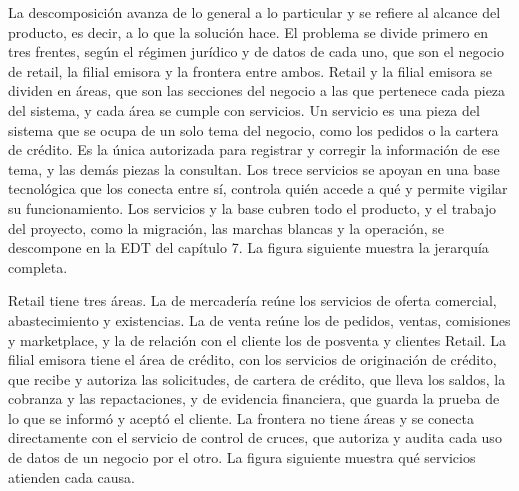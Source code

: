 \documentclass[11pt]{article}
\begin{document}
La descomposición avanza de lo general a lo particular y se refiere al alcance del producto, es decir, a lo que la solución hace. El problema se divide primero en tres frentes, según el régimen jurídico y de datos de cada uno, que son el negocio de retail, la filial emisora y la frontera entre ambos. Retail y la filial emisora se dividen en áreas, que son las secciones del negocio a las que pertenece cada pieza del sistema, y cada área se cumple con servicios. Un servicio es una pieza del sistema que se ocupa de un solo tema del negocio, como los pedidos o la cartera de crédito. Es la única autorizada para registrar y corregir la información de ese tema, y las demás piezas la consultan. Los trece servicios se apoyan en una base tecnológica que los conecta entre sí, controla quién accede a qué y permite vigilar su funcionamiento. Los servicios y la base cubren todo el producto, y el trabajo del proyecto, como la migración, las marchas blancas y la operación, se descompone en la EDT del capítulo 7. La figura siguiente muestra la jerarquía completa.


Retail tiene tres áreas. La de mercadería reúne los servicios de oferta comercial, abastecimiento y existencias. La de venta reúne los de pedidos, ventas, comisiones y marketplace, y la de relación con el cliente los de posventa y clientes Retail. La filial emisora tiene el área de crédito, con los servicios de originación de crédito, que recibe y autoriza las solicitudes, de cartera de crédito, que lleva los saldos, la cobranza y las repactaciones, y de evidencia financiera, que guarda la prueba de lo que se informó y aceptó el cliente. La frontera no tiene áreas y se conecta directamente con el servicio de control de cruces, que autoriza y audita cada uso de datos de un negocio por el otro. La figura siguiente muestra qué servicios atienden cada causa.

\end{document}
